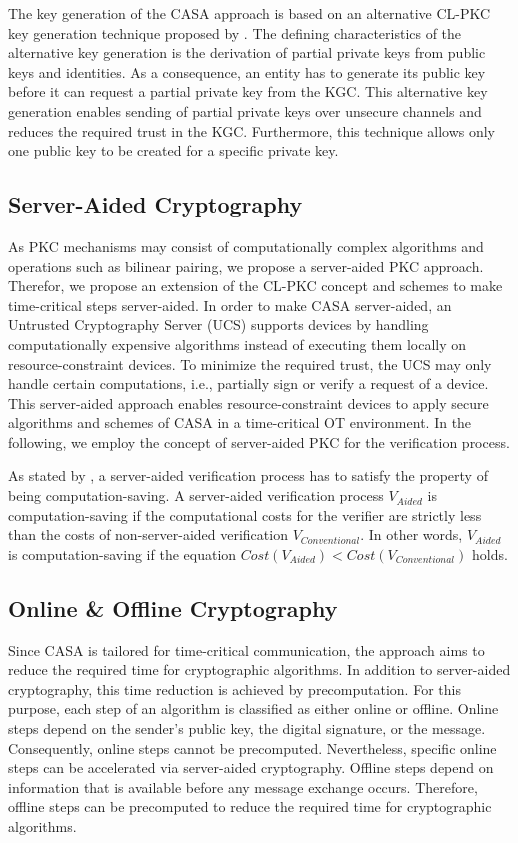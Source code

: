 The key generation of the CASA approach is based on an alternative CL-PKC key generation technique proposed by \citeauthor{AlRiyami2003}.
The defining characteristics of the alternative key generation is the derivation of partial private keys from public keys and identities.
As a consequence, an entity has to generate its public key before it can request a partial private key from the KGC.
This alternative key generation enables sending of partial private keys over unsecure channels and reduces the required trust in the KGC.
Furthermore, this technique allows only one public key to be created for a specific private key.

\subsection{Server-Aided Cryptography}
As PKC mechanisms may consist of computationally complex algorithms and operations such as bilinear pairing, we propose a server-aided PKC approach.
Therefor, we propose an extension of the CL-PKC concept and schemes to make time-critical steps server-aided.
In order to make CASA server-aided, an Untrusted Cryptography Server (UCS) supports devices by handling computationally expensive algorithms instead of executing them locally on resource-constraint devices.
To minimize the required trust, the UCS may only handle certain computations, i.e., partially sign or verify a request of a device.
This server-aided approach enables resource-constraint devices to apply secure algorithms and schemes of CASA in a time-critical OT environment.
In the following, we employ the concept of server-aided PKC for the verification process.

As stated by \citeauthor{Wu2008} \cite{Wu2008}, a server-aided verification process has to satisfy the property of being computation-saving.
A server-aided verification process $V_{Aided}$ is computation-saving if the computational costs for the verifier are strictly less than the costs of non-server-aided verification $V_{Conventional}$.
In other words, $V_{Aided}$ is computation-saving if the equation $Cost(V_{Aided}) < Cost(V_{Conventional})$ holds.

\subsection{Online \& Offline Cryptography}
Since CASA is tailored for time-critical communication, the approach aims to reduce the required time for cryptographic algorithms.
In addition to server-aided cryptography, this time reduction is achieved by precomputation.
For this purpose, each step of an algorithm is classified as either online or offline.
Online steps depend on the sender's public key, the digital signature, or the message.
Consequently, online steps cannot be precomputed.
Nevertheless, specific online steps can be accelerated via server-aided cryptography.
Offline steps depend on information that is available before any message exchange occurs.
Therefore, offline steps can be precomputed to reduce the required time for cryptographic algorithms.

